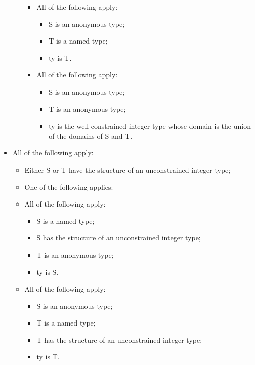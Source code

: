\documentclass{book}
\begin{document}
\begin{itemize}
\begin{itemize}
\begin{itemize}
      \item  All of the following apply:
        \begin{itemize}
        \item  S is an anonymous type;
        \item  T is a named type;
        \item  ty is T.
        \end{itemize}

      \item  All of the following apply:
        \begin{itemize}
        \item  S is an anonymous type;
        \item  T is an anonymous type;
	\item  ty is the well-constrained integer type whose domain is the union of the
	  domains of S and T.      
        \end{itemize}
      \end{itemize}
    \end{itemize}

  \item  All of the following apply:
    \begin{itemize}
    \item  Either S or T have the structure of an unconstrained integer type;
    \item  One of the following applies:

      \item  All of the following apply:
        \begin{itemize}
        \item  S is a named type;
        \item  S has the structure of an unconstrained integer type;
        \item  T is an anonymous type;
        \item  ty is S.
        \end{itemize}

      \item  All of the following apply:
        \begin{itemize}
        \item  S is an anonymous type;
        \item  T is a named type;
        \item  T has the structure of an unconstrained integer type;
        \item  ty is T.
        \end{itemize}


\end{itemize}
\end{itemize}
\end{document}
